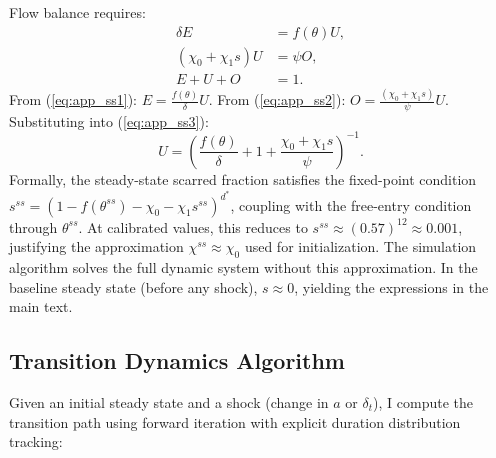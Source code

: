 \documentclass[12pt]{article}
\begin{document}
Flow balance requires:
\begin{align}
\delta E &= f(\theta) U, \label{eq:app_ss1} \\
(\chi_0 + \chi_1 s) U &= \psi O, \label{eq:app_ss2} \\
E + U + O &= 1. \label{eq:app_ss3}
\end{align}
From (\ref{eq:app_ss1}): $E = \frac{f(\theta)}{\delta} U$. From (\ref{eq:app_ss2}): $O = \frac{(\chi_0 + \chi_1 s)}{\psi} U$. Substituting into (\ref{eq:app_ss3}):
\begin{equation}
U = \left( \frac{f(\theta)}{\delta} + 1 + \frac{\chi_0 + \chi_1 s}{\psi} \right)^{-1}.
\label{eq:app_U_ss}
\end{equation}
Formally, the steady-state scarred fraction satisfies the fixed-point condition $s^{ss} = (1 - f(\theta^{ss}) - \chi_0 - \chi_1 s^{ss})^{d^*}$, coupling with the free-entry condition through $\theta^{ss}$. At calibrated values, this reduces to $s^{ss} \approx (0.57)^{12} \approx 0.001$, justifying the approximation $\chi^{ss} \approx \chi_0$ used for initialization. The simulation algorithm solves the full dynamic system without this approximation. In the baseline steady state (before any shock), $s \approx 0$, yielding the expressions in the main text.

\subsection{Transition Dynamics Algorithm}

Given an initial steady state and a shock (change in $a$ or $\delta_t$), I compute the transition path using forward iteration with explicit duration distribution tracking:
\end{document}
